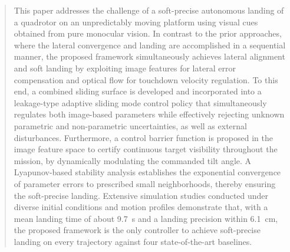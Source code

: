\documentclass{IEEEtaes}
\theoremstyle{definition}
\theoremstyle{remark}
\begin{document}
\begin{abstract}This paper addresses the challenge of a soft-precise autonomous landing of a quadrotor on an unpredictably moving platform using visual cues obtained from pure monocular vision. In contrast to the prior approaches, where the lateral convergence and landing are accomplished in a sequential manner, the proposed framework simultaneously achieves lateral alignment and soft landing by exploiting image features for lateral error compensation and optical flow for touchdown velocity regulation. To this end, a combined sliding surface is developed and incorporated into a leakage-type adaptive sliding mode control policy that simultaneously regulates both image-based parameters while effectively rejecting unknown parametric and non-parametric uncertainties, as well as external disturbances. Furthermore, a control barrier function is proposed in the image feature space to certify continuous target visibility throughout the mission, by dynamically modulating the commanded tilt angle. A Lyapunov-based stability analysis establishes the exponential convergence of parameter errors to prescribed small neighborhoods, thereby ensuring the soft-precise landing. Extensive simulation studies conducted under diverse initial conditions and motion profiles demonstrate that, with a mean landing time of about 9.7~s and a landing precision within 6.1~cm, the proposed framework is the only controller to achieve soft-precise landing on every trajectory against four state-of-the-art baselines.
\end{abstract}

\end{document}
